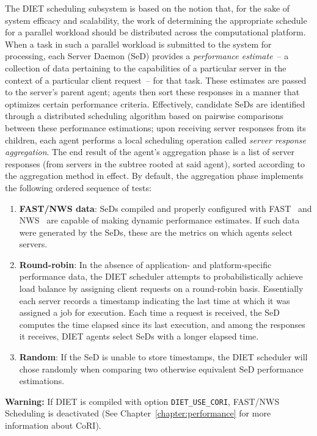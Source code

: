 The DIET scheduling subsystem is based on the notion that, for the
sake of system efficacy and scalability, the work of
determining the appropriate schedule for a parallel workload should be
distributed across the computational platform.  When a task in
such a parallel workload is submitted to the system for processing,
each Server Daemon (SeD) provides a
\emph{performance estimate}~-- a collection of data pertaining to
the capabilities of a particular server in the context of a particular
client request~-- for that task.  These estimates are
passed to the server's parent agent; agents then
sort these responses in a manner that optimizes certain performance
criteria.
Effectively, candidate SeDs are identified through a distributed
scheduling algorithm based on
pairwise comparisons between these
performance estimations; upon receiving server responses from its
children, each agent performs a local scheduling operation called
\emph{server response aggregation}.  The end result of the agent's
aggregation phase is a list of server responses (from servers in the
subtree rooted at said agent), sorted according to the
aggregation method in effect.
By default, the aggregation phase
implements the following ordered sequence of tests:

\begin{enumerate}
\item \textbf{FAST/NWS data}: SeDs compiled and properly configured with
  FAST~\cite{Qui02} and
  NWS~\cite{WSH99}
  are capable of making dynamic
  performance estimates.  If such data
  were generated by the SeDs, these are the metrics on which agents
  select servers.
\item \textbf{Round-robin}: In the absence of application- and
  platform-specific performance
  data, the DIET scheduler attempts to probabilistically achieve load
  balance by assigning client requests on a round-robin
  basis.  Essentially each server records a timestamp indicating the
  last time at which it was assigned a job for execution.  Each time a
  request is received, the SeD computes the time elapsed since its
  last execution, and among the responses it receives, DIET agents
  select SeDs with a longer elapsed time.
\item \textbf{Random}: If the SeD is unable to store
  timestamps, the DIET scheduler will chose randomly when
  comparing two otherwise equivalent SeD performance estimations.
\end{enumerate}

\textbf{Warning:} If DIET is compiled with option \texttt{DIET\_USE\_CORI},
FAST/NWS Scheduling is deactivated (See
Chapter~\ref{chapter:performance} for more information about CoRI).

